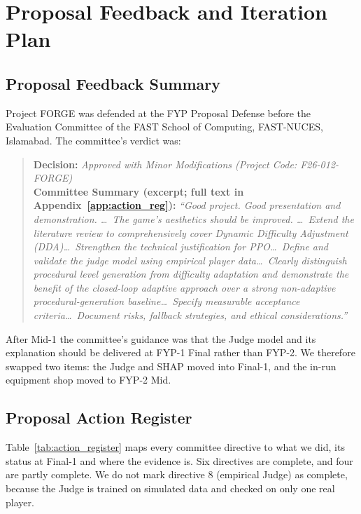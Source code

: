 \chapter{Proposal Feedback and Iteration Plan}
\label{chap:plan}

\section{Proposal Feedback Summary}
Project FORGE was defended at the FYP Proposal Defense before the Evaluation Committee of the FAST School of Computing, FAST-NUCES, Islamabad. The committee's verdict was:
\begin{quote}
\textbf{Decision:} \textit{Approved with Minor Modifications (Project Code: F26-012-FORGE)}\\
\textbf{Committee Summary (excerpt; full text in Appendix~\ref{app:action_reg}):} \textit{``Good project. Good presentation and demonstration. \ldots\ The game's aesthetics should be improved. \ldots\ Extend the literature review to comprehensively cover Dynamic Difficulty Adjustment (DDA)\ldots\ Strengthen the technical justification for PPO\ldots\ Define and validate the judge model using empirical player data\ldots\ Clearly distinguish procedural level generation from difficulty adaptation and demonstrate the benefit of the closed-loop adaptive approach over a strong non-adaptive procedural-generation baseline\ldots\ Specify measurable acceptance criteria\ldots\ Document risks, fallback strategies, and ethical considerations.''}
\end{quote}

After Mid-1 the committee's guidance was that the Judge model and its explanation should be delivered at FYP-1 Final rather than FYP-2. We therefore swapped two items: the Judge and SHAP moved into Final-1, and the in-run equipment shop moved to FYP-2 Mid. 

\section{Proposal Action Register}
Table~\ref{tab:action_register} maps every committee directive to what we did, its status at Final-1 and where the evidence is. Six directives are complete, and four are partly complete. We do not mark directive 8 (empirical Judge) as complete, because the Judge is trained on simulated data and checked on only one real player.

